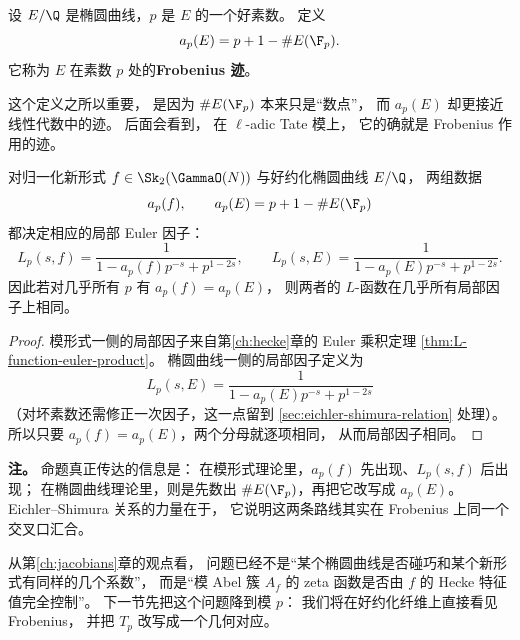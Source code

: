 \begin{definition}[椭圆曲线的局部迹]
\label{def:ch08-ap-of-elliptic-curve}
设 $E/\Q$ 是椭圆曲线，$p$ 是 $E$ 的一个好素数。
定义
\[
  a_p(E)=p+1-\#E(\F_p).
\]
它称为 $E$ 在素数 $p$ 处的\textbf{Frobenius 迹}。
\end{definition}

这个定义之所以重要，
是因为 $\#E(\F_p)$ 本来只是“数点”，
而 $a_p(E)$ 却更接近线性代数中的迹。
后面会看到，
在 $\ell$-adic Tate 模上，
它的确就是 Frobenius 作用的迹。

\begin{proposition}[解析世界与算术世界的两组 $a_p$]
\label{prop:ch08-two-ap-worlds}
对归一化新形式 $f\in \Sk_2(\GammaO(N))$ 与好约化椭圆曲线 $E/\Q$，
两组数据
\[
  a_p(f),\qquad a_p(E)=p+1-\#E(\F_p)
\]
都决定相应的局部 Euler 因子：
\[
  L_p(s,f)=\frac{1}{1-a_p(f)p^{-s}+p^{1-2s}},
  \qquad
  L_p(s,E)=\frac{1}{1-a_p(E)p^{-s}+p^{1-2s}}.
\]
因此若对几乎所有 $p$ 有 $a_p(f)=a_p(E)$，
则两者的 $L$-函数在几乎所有局部因子上相同。
\end{proposition}

\begin{proof}
模形式一侧的局部因子来自第\ref{ch:hecke}章的 Euler 乘积定理 \cref{thm:L-function-euler-product}。
椭圆曲线一侧的局部因子定义为
\[
  L_p(s,E)=\frac{1}{1-a_p(E)p^{-s}+p^{1-2s}}
\]
（对坏素数还需修正一次因子，这一点留到 \cref{sec:eichler-shimura-relation} 处理）。
所以只要 $a_p(f)=a_p(E)$，两个分母就逐项相同，
从而局部因子相同。
\end{proof}

\textbf{注。}
命题真正传达的信息是：
在模形式理论里，$a_p(f)$ 先出现、$L_p(s,f)$ 后出现；
在椭圆曲线理论里，则是先数出 $\#E(\F_p)$，再把它改写成 $a_p(E)$。
Eichler--Shimura 关系的力量在于，
它说明这两条路线其实在 Frobenius 上同一个交叉口汇合。

从第\ref{ch:jacobians}章的观点看，
问题已经不是“某个椭圆曲线是否碰巧和某个新形式有同样的几个系数”，
而是“模 Abel 簇 $A_f$ 的 zeta 函数是否由 $f$ 的 Hecke 特征值完全控制”。
下一节先把这个问题降到模 $p$：
我们将在好约化纤维上直接看见 Frobenius，
并把 $T_p$ 改写成一个几何对应。
